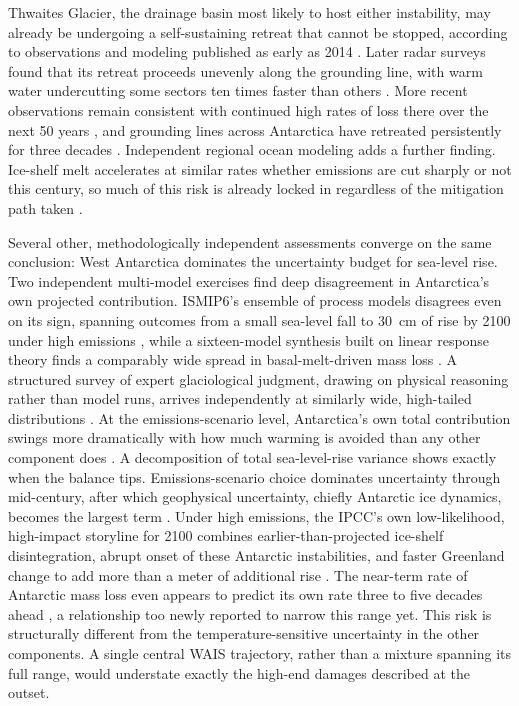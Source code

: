 \documentclass[12pt]{article}
\begin{document}
Thwaites Glacier, the drainage basin most likely to host either
instability, may already be undergoing a self-sustaining retreat that
cannot be stopped, according to observations and modeling published as
early as 2014 \citep{Joughin2014}. Later radar surveys found that its
retreat proceeds unevenly along the grounding line, with warm water
undercutting some sectors ten times faster than others
\citep{Milillo2019}. More recent observations remain consistent with
continued high rates of loss there over the next 50 years
\citep{Goldberg2026}, and grounding lines across Antarctica have
retreated persistently for three decades \citep{Rignot2026}. Independent
regional ocean modeling adds a further finding. Ice-shelf melt
accelerates at similar rates whether emissions are cut sharply or not
this century, so much of this risk is already locked in regardless of
the mitigation path taken \citep{Naughten2023}.

Several other, methodologically independent assessments converge on the
same conclusion: West Antarctica dominates the uncertainty budget for
sea-level rise. Two independent multi-model exercises find deep
disagreement in Antarctica's own projected contribution. ISMIP6's
ensemble of process models disagrees even on its sign, spanning
outcomes from a small sea-level fall to 30~cm of rise by 2100 under
high emissions \citep{Seroussi2020}, while a sixteen-model synthesis
built on linear response theory finds a comparably wide spread in
basal-melt-driven mass loss \citep{Levermann2020}. A structured survey
of expert glaciological judgment, drawing on physical reasoning rather
than model runs, arrives independently at similarly wide, high-tailed
distributions \citep{Bamber2019}. At the emissions-scenario level,
Antarctica's own total contribution swings more dramatically with how
much warming is avoided than any other component does
\citep{DeConto2021}. A decomposition of total sea-level-rise variance
shows exactly when the balance tips. Emissions-scenario choice
dominates uncertainty through mid-century, after which geophysical
uncertainty, chiefly Antarctic ice dynamics, becomes the largest term
\citep{Darnell2025}. Under high emissions, the IPCC's own
low-likelihood, high-impact storyline for 2100 combines
earlier-than-projected ice-shelf disintegration, abrupt onset of these
Antarctic instabilities, and faster Greenland change to add more than a
meter of additional rise \citep{Fox-Kemper2021}. The near-term rate of
Antarctic mass loss even appears to predict its own rate three to five
decades ahead \citep{McCormack2026}, a relationship too newly reported
to narrow this range yet. This risk is structurally different from the
temperature-sensitive uncertainty in the other components. A single
central WAIS trajectory, rather than a mixture spanning its full range,
would understate exactly the high-end damages described at the outset.
\end{document}
